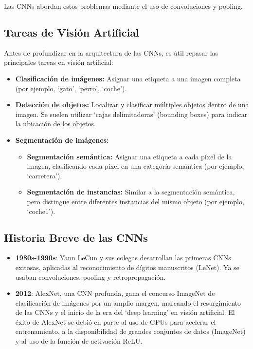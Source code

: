 \documentclass{article}
\begin{document}
Las CNNs abordan estos problemas mediante el uso de convoluciones y pooling.

\subsection{Tareas de Visión Artificial}

Antes de profundizar en la arquitectura de las CNNs, es útil repasar las principales tareas en visión artificial:

\begin{itemize}
    \item \textbf{Clasificación de imágenes:} Asignar una etiqueta a una imagen completa (por ejemplo, `gato', `perro', `coche').
    \item \textbf{Detección de objetos:} Localizar y clasificar múltiples objetos dentro de una imagen.  Se suelen utilizar `cajas delimitadoras' (bounding boxes) para indicar la ubicación de los objetos.
    \item \textbf{Segmentación de imágenes:}
        \begin{itemize}
            \item \textbf{Segmentación semántica:} Asignar una etiqueta a cada píxel de la imagen, clasificando cada píxel en una categoría semántica (por ejemplo, `carretera').
            \item \textbf{Segmentación de instancias:} Similar a la segmentación semántica, pero distingue entre diferentes instancias del mismo objeto (por ejemplo, `coche1').
        \end{itemize}
\end{itemize}

\subsection{Historia Breve de las CNNs}
\begin{itemize}
  \item \textbf{1980s-1990s}: Yann LeCun y sus colegas desarrollan las primeras CNNs exitosas, aplicadas al reconocimiento de dígitos manuscritos (LeNet). Ya se usaban convoluciones, pooling y retropropagación.
\item \textbf{2012}: AlexNet, una CNN profunda, gana el concurso ImageNet de clasificación de imágenes por un amplio margen, marcando el resurgimiento de las CNNs y el inicio de la era del `deep learning' en visión artificial. El éxito de AlexNet se debió en parte al uso de GPUs para acelerar el entrenamiento, a la disponibilidad de grandes conjuntos de datos (ImageNet) y al uso de la función de activación ReLU.
\end{itemize}
\end{document}
